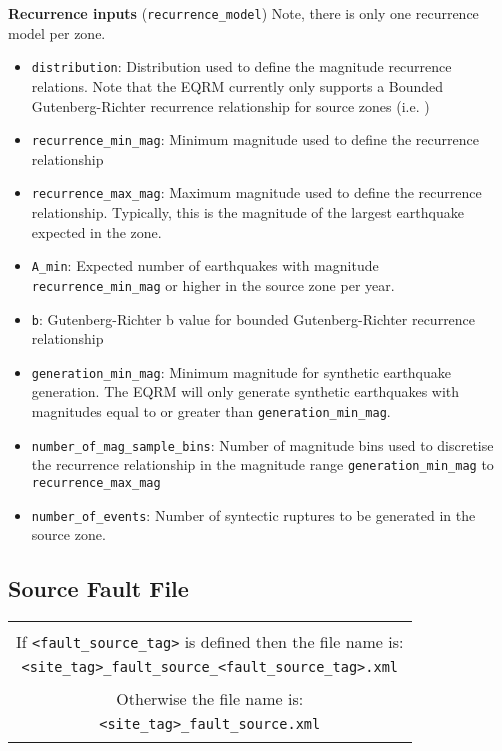 \textbf{Recurrence inputs} (\texttt{recurrence\_model})
Note, there is only one recurrence model per zone.
\begin{itemize}
\item \texttt{distribution}: Distribution used to define the magnitude recurrence relations. Note that
the EQRM currently only supports a Bounded Gutenberg-Richter recurrence
relationship for source zones (i.e.
)
\item \texttt{recurrence\_min\_mag}: Minimum magnitude used to
define the recurrence relationship
\item \texttt{recurrence\_max\_mag}: Maximum magnitude used to
define the recurrence relationship. Typically, this is the magnitude
of the largest earthquake expected in the zone.
\item \texttt{A\_min}: Expected number of earthquakes with magnitude \texttt{recurrence\_min\_mag}
or higher in the source zone per year.
\item \texttt{b}: Gutenberg-Richter b value for bounded Gutenberg-Richter recurrence
relationship
\item \texttt{generation\_min\_mag}: Minimum magnitude for synthetic
earthquake generation. The EQRM will only generate synthetic
earthquakes with magnitudes equal to or greater than
\texttt{generation\_min\_mag}.
\item \texttt{number\_of\_mag\_sample\_bins}: Number of magnitude
bins used to discretise the recurrence relationship in the magnitude
range \texttt{generation\_min\_mag} to
\texttt{recurrence\_max\_mag}
\item \texttt{number\_of\_events}: Number of syntectic ruptures to
be generated in the source zone.
\end{itemize}

\subsection{Source Fault File}

\begin{center}
\begin{tabular}{|c|}
\hline
 \\
 If \texttt{<fault\_source\_tag>} is defined then the file name is:\\
\texttt{<site\_tag>\_}\texttt{fault\_source\_}\texttt{<fault\_source\_tag>}\texttt{.xml}
\\
\\
Otherwise the file name is:\\
\texttt{<site\_tag>\_}\texttt{fault\_source}\texttt{.xml}\\
\\
\hline
\end{tabular}
\end{center}


